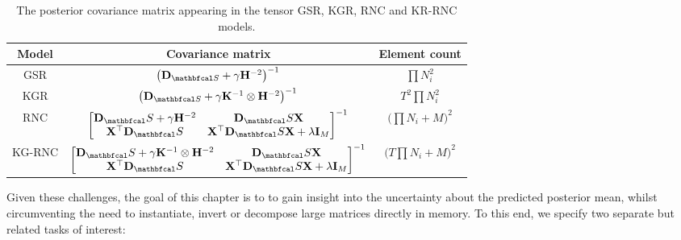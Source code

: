 \begin{table}[t]
    \def\arraystretch{1.5}
    \centering
    \begin{tabular}{|c|c|c|}
    \hline
    \textbf{Model} & \textbf{Covariance matrix} & \textbf{Element count}\\
    \hline
    GSR & $\left(\D_{\St} + \gamma \HH^{-2}\right)^{-1}$ & $ \prod N_i^2 $\\ 
    \hline
    KGR & $\left(\D_{\St} + \gamma \K^{-1} \otimes \HH^{-2}\right)^{-1}$ & $T^2\prod N_i^2$\\ 
    \hline
    RNC & $\begin{bmatrix}
        \D_\St + \gamma \HH^{-2} & \D_\St  \X \\
        \X^\top \D_\St & \X^\top \D_\St \X + \lambda \I_M   
       \end{bmatrix}^{-1}$ & $\Big(\prod N_i + M\Big)^2$ \\ 
    \hline
    KG-RNC & $\begin{bmatrix}
        \D_\St + \gamma \K^{-1} \otimes \HH^{-2} & \D_\St  \X \\
        \X^\top \D_\St & \X^\top \D_\St \X + \lambda \I_M   
       \end{bmatrix}^{-1}$ & $\Big(T\prod N_i + M\Big)^2$ \\
    \hline
\end{tabular}
\caption{The posterior covariance matrix appearing in the tensor GSR, KGR, RNC and KR-RNC models.  }
\label{tab:post_cov}
\end{table}

\setcellgapes{2pt}


Given these challenges, the goal of this chapter is to to gain insight into the uncertainty about the predicted posterior mean, whilst circumventing the need to instantiate, invert or decompose large matrices directly in memory. To this end, we specify two separate but related tasks of interest:

